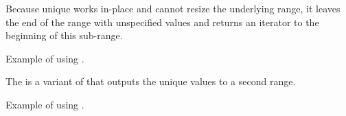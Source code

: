 
Because unique works in-place and cannot resize the underlying range, it leaves the end of the range with unspecified values and returns an iterator to the beginning of this sub-range.

\begin{codebox}[]{\href{https://compiler-explorer.com/z/7bcKTfe9b}{\ExternalLink}}
\footnotesize Example of using .
\tcblower
{}
\end{codebox}

The  is a variant of  that outputs the unique values to a second range.


\begin{codebox}[]{\href{https://compiler-explorer.com/z/TMP7ec6P5}{\ExternalLink}}
\footnotesize Example of using .
\tcblower
{}
\end{codebox}
